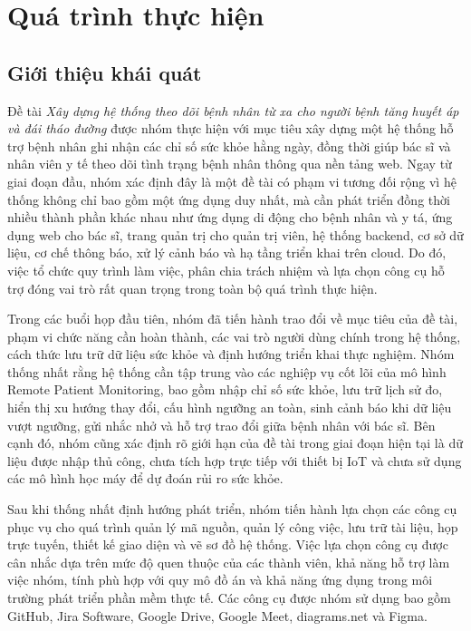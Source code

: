 \chapter{Quá trình thực hiện}
\label{Chapter4}

\section{Giới thiệu khái quát}
\par Đề tài \textit{Xây dựng hệ thống theo dõi bệnh nhân từ xa cho người bệnh tăng huyết áp và đái tháo đường} được nhóm thực hiện với mục tiêu xây dựng một hệ thống hỗ trợ bệnh nhân ghi nhận các chỉ số sức khỏe hằng ngày, đồng thời giúp bác sĩ và nhân viên y tế theo dõi tình trạng bệnh nhân thông qua nền tảng web. Ngay từ giai đoạn đầu, nhóm xác định đây là một đề tài có phạm vi tương đối rộng vì hệ thống không chỉ bao gồm một ứng dụng duy nhất, mà cần phát triển đồng thời nhiều thành phần khác nhau như ứng dụng di động cho bệnh nhân và y tá, ứng dụng web cho bác sĩ, trang quản trị cho quản trị viên, hệ thống backend, cơ sở dữ liệu, cơ chế thông báo, xử lý cảnh báo và hạ tầng triển khai trên cloud. Do đó, việc tổ chức quy trình làm việc, phân chia trách nhiệm và lựa chọn công cụ hỗ trợ đóng vai trò rất quan trọng trong toàn bộ quá trình thực hiện.

\par Trong các buổi họp đầu tiên, nhóm đã tiến hành trao đổi về mục tiêu của đề tài, phạm vi chức năng cần hoàn thành, các vai trò người dùng chính trong hệ thống, cách thức lưu trữ dữ liệu sức khỏe và định hướng triển khai thực nghiệm. Nhóm thống nhất rằng hệ thống cần tập trung vào các nghiệp vụ cốt lõi của mô hình Remote Patient Monitoring, bao gồm nhập chỉ số sức khỏe, lưu trữ lịch sử đo, hiển thị xu hướng thay đổi, cấu hình ngưỡng an toàn, sinh cảnh báo khi dữ liệu vượt ngưỡng, gửi nhắc nhở và hỗ trợ trao đổi giữa bệnh nhân với bác sĩ. Bên cạnh đó, nhóm cũng xác định rõ giới hạn của đề tài trong giai đoạn hiện tại là dữ liệu được nhập thủ công, chưa tích hợp trực tiếp với thiết bị IoT và chưa sử dụng các mô hình học máy để dự đoán rủi ro sức khỏe.

\par Sau khi thống nhất định hướng phát triển, nhóm tiến hành lựa chọn các công cụ phục vụ cho quá trình quản lý mã nguồn, quản lý công việc, lưu trữ tài liệu, họp trực tuyến, thiết kế giao diện và vẽ sơ đồ hệ thống. Việc lựa chọn công cụ được cân nhắc dựa trên mức độ quen thuộc của các thành viên, khả năng hỗ trợ làm việc nhóm, tính phù hợp với quy mô đồ án và khả năng ứng dụng trong môi trường phát triển phần mềm thực tế. Các công cụ được nhóm sử dụng bao gồm GitHub, Jira Software, Google Drive, Google Meet, diagrams.net và Figma.

